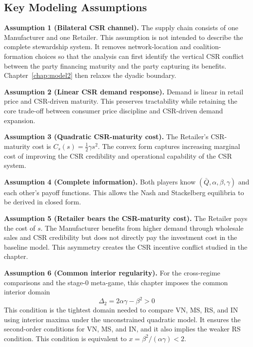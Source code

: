 \subsection{Key Modeling Assumptions}

\textbf{Assumption 1 (Bilateral CSR channel).} The supply chain consists of one Manufacturer and one Retailer. This assumption is not intended to describe the complete stewardship system. It removes network-location and coalition-formation choices so that the analysis can first identify the vertical CSR conflict between the party financing maturity and the party capturing its benefits. Chapter~\ref{chap:model2} then relaxes the dyadic boundary.

\textbf{Assumption 2 (Linear CSR demand response).} Demand is linear in retail price and CSR-driven maturity. This preserves tractability while retaining the core trade-off between consumer price discipline and CSR-driven demand expansion.

\textbf{Assumption 3 (Quadratic CSR-maturity cost).} The Retailer's CSR-maturity cost is $C_s(s)=\frac12\gamma s^2$. The convex form captures increasing marginal cost of improving the CSR credibility and operational capability of the CSR system.

\textbf{Assumption 4 (Complete information).} Both players know $(\bar{Q},\alpha,\beta,\gamma)$ and each other's payoff functions. This allows the Nash and Stackelberg equilibria to be derived in closed form.

\textbf{Assumption 5 (Retailer bears the CSR-maturity cost).} The Retailer pays the cost of $s$. The Manufacturer benefits from higher demand through wholesale sales and CSR credibility but does not directly pay the investment cost in the baseline model. This asymmetry creates the CSR incentive conflict studied in the chapter.

\textbf{Assumption 6 (Common interior regularity).} 
For the cross-regime comparisons and the stage-0 meta-game, this chapter imposes the common interior domain
\begin{equation}
    \Delta_2=2\alpha\gamma-\beta^2>0
    \label{eq:common_regularity}
\end{equation}
This condition is the tightest domain needed to compare VN, MS, RS, and IN using interior maxima under the unconstrained quadratic model. It ensures the second-order conditions for VN, MS, and IN, and it also implies the weaker RS condition. This condition is equivalent to $x=\beta^2/(\alpha\gamma)<2$. 

